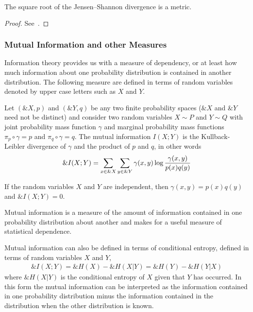 \begin{theorem}
  The square root of the Jensen–Shannon divergence is a metric.
\end{theorem}
\begin{proof}
  See~\cite{ref:endres-2003}.
\end{proof}

\subsubsection*{Mutual Information and other Measures}

Information theory provides us with a measure of dependency, or at least how
much information about one probability distribution is contained in another
distribution. The following measure are defined in terms of random variables
denoted by upper case letters such as $X$ and $Y$.

\begin{definition}
  Let $(\&X, p)$ and $(\&Y, q)$ be any two finite probability spaces ($\&X$ and
  $\&Y$ need not be distinct) and consider two random variables $X \sim P$ and
  $Y \sim Q$ with joint probability mass function $\gamma$ and marginal
  probability mass functions $\pi_p \circ \gamma = p$ and $\pi_q \circ \gamma =
  q$. The \textnormal{\sffamily mutual information} $I(X;Y)$ is the
  Kullback-Leibler divergence of $\gamma$ and the product of $p$ and $q$, in
  other words
  \begin{align}
    \label{eq:mutual-information}
    \&I(X; Y) = \sum_{x \in \&X}\sum_{y \in \&Y}\gamma(x, y) \log{{\gamma(x, y) \over p(x)q(y)}}
  \end{align}
\end{definition}

\begin{theorem}
  If the random variables $X$ and $Y$ are independent, then $\gamma(x,y) =
  p(x)q(y)$ and $\&I(X; Y) = 0$.
\end{theorem}

\begin{remark}
  Mutual information is a measure of the amount of information contained in one
  probability distribution about another and makes for a useful measure of
  statistical dependence.
\end{remark}

\begin{remark}
  Mutual information can also be defined in terms of conditional entropy,
  defined in terms of random variables $X$ and $Y$,
  \begin{align}
    \label{eq:mutual-information-alt}
    \&I(X; Y) = \&H(X) - \&H(X | Y) = \&H(Y) - \&H(Y | X)
  \end{align}
  where $\&H(X | Y)$ is the conditional entropy of $X$ given that $Y$ has
  occurred. In this form the mutual information can be interpreted as the
  information contained in one probability distribution minus the information
  contained in the distribution when the other distribution is known.
  \end{remark}

